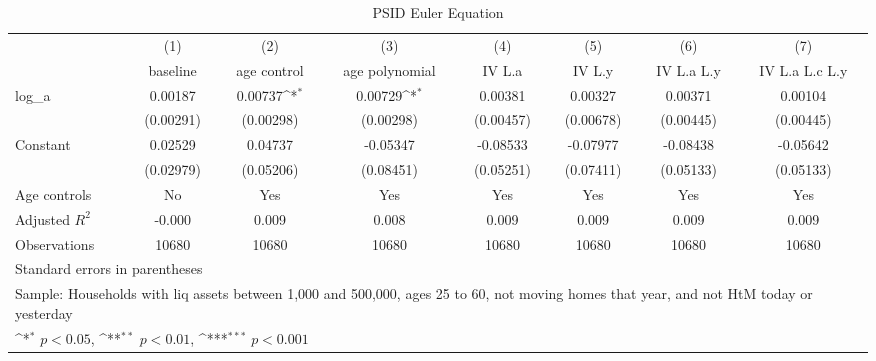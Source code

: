 {
\def\sym#1{\ifmmode^{#1}\else\(^{#1}\)\fi}
\begin{longtable}{l*{7}{c}}
\caption{PSID Euler Equation}\\
\toprule\endfirsthead\midrule\endhead\midrule\endfoot\endlastfoot
                    &\multicolumn{1}{c}{(1)}&\multicolumn{1}{c}{(2)}&\multicolumn{1}{c}{(3)}&\multicolumn{1}{c}{(4)}&\multicolumn{1}{c}{(5)}&\multicolumn{1}{c}{(6)}&\multicolumn{1}{c}{(7)}\\
                    &\multicolumn{1}{c}{baseline}&\multicolumn{1}{c}{age control}&\multicolumn{1}{c}{age polynomial}&\multicolumn{1}{c}{IV L.a}&\multicolumn{1}{c}{IV L.y}&\multicolumn{1}{c}{IV L.a L.y}&\multicolumn{1}{c}{IV L.a L.c L.y}\\
\midrule
log\_a               &     0.00187         &     0.00737\sym{*}  &     0.00729\sym{*}  &     0.00381         &     0.00327         &     0.00371         &     0.00104         \\
                    &   (0.00291)         &   (0.00298)         &   (0.00298)         &   (0.00457)         &   (0.00678)         &   (0.00445)         &   (0.00445)         \\
\addlinespace
Constant            &     0.02529         &     0.04737         &    -0.05347         &    -0.08533         &    -0.07977         &    -0.08438         &    -0.05642         \\
                    &   (0.02979)         &   (0.05206)         &   (0.08451)         &   (0.05251)         &   (0.07411)         &   (0.05133)         &   (0.05133)         \\
\addlinespace
Age controls        &          No         &         Yes         &         Yes         &         Yes         &         Yes         &         Yes         &         Yes         \\
\midrule
Adjusted \(R^{2}\)  &      -0.000         &       0.009         &       0.008         &       0.009         &       0.009         &       0.009         &       0.009         \\
Observations        &       10680         &       10680         &       10680         &       10680         &       10680         &       10680         &       10680         \\
\bottomrule
\multicolumn{8}{l}{\footnotesize Standard errors in parentheses}\\
\multicolumn{8}{l}{\footnotesize Sample: Households with liq assets between 1,000 and 500,000, ages 25 to 60, not moving homes that year, and not HtM today or yesterday}\\
\multicolumn{8}{l}{\footnotesize \sym{*} \(p<0.05\), \sym{**} \(p<0.01\), \sym{***} \(p<0.001\)}\\
\end{longtable}
}
